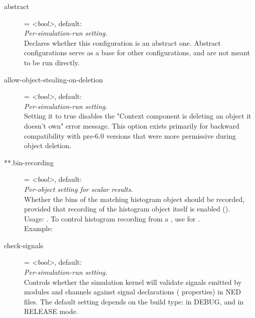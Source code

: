\begin{description}
\item[abstract] = \textit{<bool>}, default: \\
    \textit{Per-simulation-run setting.}\\
    Declares whether this configuration is an abstract one. Abstract
    configurations serve as a base for other configurations, and are not meant
    to be run directly.
\item[allow-object-stealing-on-deletion] = \textit{<bool>}, default: \\
    \textit{Per-simulation-run setting.}\\
    Setting it to true disables the "Context component is deleting an object it
    doesn't own" error message. This option exists primarily for backward
    compatibility with pre-6.0 versions that were more permissive during object
    deletion.
\item[**.bin-recording] = \textit{<bool>}, default: \\
    \textit{Per-object setting for scalar results.}\\
    Whether the bins of the matching histogram object should be recorded,
    provided that recording of the histogram object itself is enabled
    ().\\
    Usage:
    .
    To control histogram recording from a , use
     for
    .\\
    Example:
\item[check-signals] = \textit{<bool>}, default: \\
    \textit{Per-simulation-run setting.}\\
    Controls whether the simulation kernel will validate signals emitted by
    modules and channels against signal declarations
    ( properties) in NED files. The default setting
    depends on the build type:  in DEBUG, and  in RELEASE
    mode.

\end{description}
